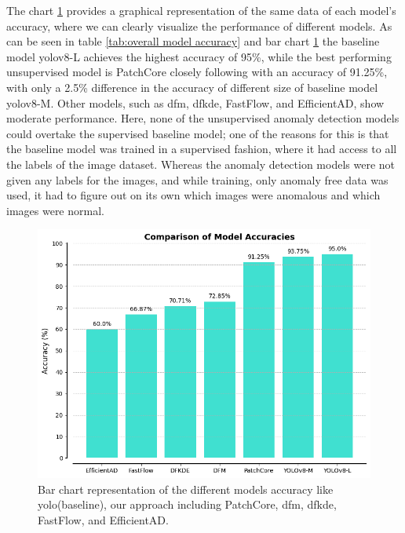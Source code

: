 The chart \ref{fig:bar chart models accruacy} provides a graphical representation of the same data of each model's accuracy, where we can clearly visualize the performance of different models. As can be seen in table \ref{tab:overall model accuracy} and bar chart \ref{fig:bar chart models accruacy} the baseline model \gls{yolo}v8-L achieves the highest accuracy of 95\%, while the best performing unsupervised model is PatchCore closely following with an accuracy of 91.25\%, with only a 2.5\% difference in the accuracy of different size of baseline model \gls{yolo}v8-M. Other models, such as \gls{dfm}, \gls{dfkde}, FastFlow, and EfficientAD, show moderate performance. Here, none of the unsupervised anomaly detection models could overtake the supervised baseline model; one of the reasons for this is that the baseline model was trained in a supervised fashion, where it had access to all the labels of the image dataset. Whereas the anomaly detection models were not given any labels for the images, and while training, only anomaly free data was used, it had to figure out on its own which images were anomalous and which images were normal.

\begin{figure}[ht!]
    \centering
    \includegraphics[width=1.1\linewidth]{Rohit_Master_Thesis//Images/bar_chart_model_acc.png}
    \caption{Bar chart representation of the different models accuracy like \gls{yolo}(baseline), our approach including PatchCore, \gls{dfm}, \gls{dfkde}, FastFlow, and EfficientAD.}
    \label{fig:bar chart models accruacy}
\end{figure}

